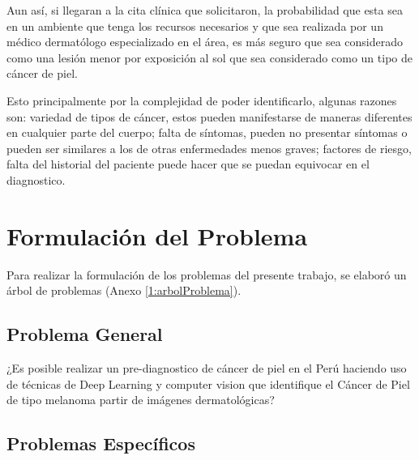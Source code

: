 Aun así, si llegaran a la cita clínica que solicitaron, la probabilidad que esta sea en un ambiente que tenga los recursos necesarios y que sea realizada por un médico dermatólogo especializado en el área, es más seguro que sea considerado como una lesión menor por exposición al sol que sea considerado como un tipo de cáncer de piel. 

Esto principalmente por la complejidad de poder identificarlo, algunas razones son: variedad de tipos de cáncer, estos pueden manifestarse de maneras diferentes en cualquier parte del cuerpo; falta de síntomas, pueden no presentar síntomas o pueden ser similares a los de otras enfermedades menos graves; factores de riesgo, falta del historial del paciente puede hacer que se puedan equivocar en el diagnostico.



\section{Formulación del Problema}

Para realizar la formulación de los problemas del presente trabajo, se elaboró un árbol de problemas (Anexo \ref{1:arbolProblema}).

\subsection{Problema General}
\newcommand{\ProblemaGeneral}{
¿Es posible realizar un pre-diagnostico de cáncer de piel en el Perú  haciendo uso de técnicas de Deep Learning y computer vision que identifique el Cáncer de Piel de tipo melanoma partir de imágenes dermatológicas?

}
\ProblemaGeneral
\subsection{Problemas Espec\'{i}ficos}
\newcommand{\Pbone}{
¿Cuáles son los algoritmos de Deep Learning que pueden clasificar con precisión el cáncer de piel de tipo melanoma en imágenes dermatológicas?
}
\newcommand{\Pbtwo}{
¿Cómo evaluar la precisión de los modelos de Deep Learning en la detección de cáncer de piel de tipo melanoma?
}
\newcommand{\Pbthree}{
¿Qué tipo de ruido pude haber en las imágenes dermatológicas que dificulté la detección del  cáncer de piel de tipo melanoma? 
}
\newcommand{\Pbfour}{
¿Cómo afecta la disponibilidad de la base de datos de imágenes dermatológicas en el desarrollo de un sistema de detección del  cáncer de piel de tipo melanoma?
}

